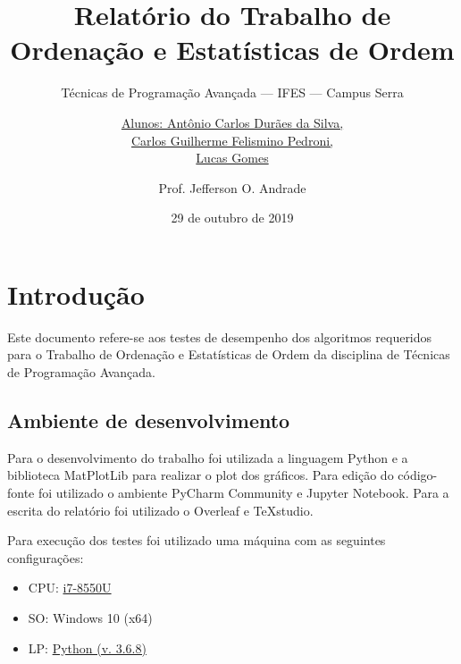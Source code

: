 \documentclass[a4paper,12pt]{scrartcl}
\title{Relatório do Trabalho de Ordenação e Estatísticas de Ordem}
\subtitle{Técnicas de Programação Avançada --- IFES --- Campus Serra}
\author{\uline{Alunos: Antônio Carlos Durães da Silva, \\Carlos Guilherme Felismino Pedroni, \\Lucas Gomes}
  \and Prof. Jefferson O. Andrade}
\date{29 de outubro de 2019}
\begin{document}
\maketitle
\tableofcontents
\listoflistings
\listoffigures

\section{Introdução}

Este documento refere-se aos testes de desempenho dos algoritmos requeridos para o Trabalho de Ordenação e Estatísticas de Ordem da disciplina de Técnicas de Programação Avançada.
\begin{comment}
\section{Enunciado}

Este trabalho consiste de duas etapas:

\begin{enumerate}
\item Implementação de um conjunto de algoritmos de ordenação.
\item Análise do desempenho dos algoritmos implementados.
\end{enumerate}

A descrição destas duas etapas será vista com mais detalhes abaixo.
\end{comment}

\subsection{Ambiente de desenvolvimento}
\label{sec:implementacao}

Para o desenvolvimento do trabalho foi utilizada a linguagem Python e a biblioteca MatPlotLib para realizar o plot dos gráficos. Para edição do código-fonte foi utilizado o ambiente PyCharm Community e Jupyter Notebook. Para a escrita do relatório foi utilizado o Overleaf e TeXstudio.

Para execução dos testes foi utilizado uma máquina com as seguintes configurações:
\begin{itemize}
    \item CPU: \href{https://www.intel.com.br/content/www/br/pt/products/processors/core/i7-processors/i7-8550u.html}{i7-8550U}
    \item SO: Windows 10 (x64)
    \item LP: \href{https://www.python.org/downloads/release/python-368/}{Python (v. 3.6.8)}
\end{itemize}
\end{document}
